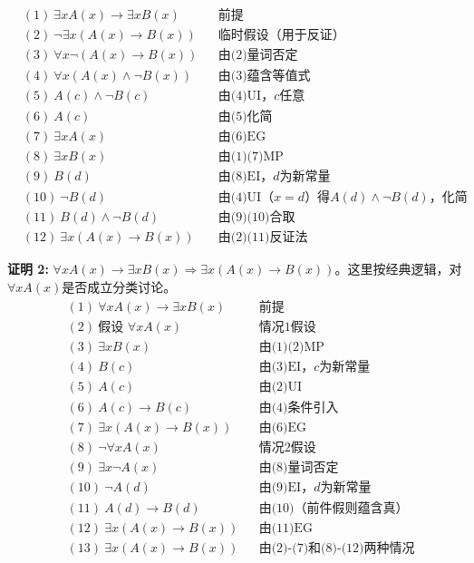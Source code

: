 \begin{align*}
&(1)\ \exists xA(x) \to \exists xB(x) && \text{前提} \\
&(2)\ \neg\exists x(A(x)\to B(x)) && \text{临时假设（用于反证）} \\
&(3)\ \forall x\neg(A(x)\to B(x)) && \text{由(2)量词否定} \\
&(4)\ \forall x(A(x) \land \neg B(x)) && \text{由(3)蕴含等值式} \\
&(5)\ A(c) \land \neg B(c) && \text{由(4)UI，$c$任意} \\
&(6)\ A(c) && \text{由(5)化简} \\
&(7)\ \exists xA(x) && \text{由(6)EG} \\
&(8)\ \exists xB(x) && \text{由(1)(7)MP} \\
&(9)\ B(d) && \text{由(8)EI，$d$为新常量} \\
&(10)\ \neg B(d) && \text{由(4)UI（$x=d$）得$A(d) \land \neg B(d)$，化简} \\
&(11)\ B(d) \land \neg B(d) && \text{由(9)(10)合取} \\
&(12)\ \exists x(A(x)\to B(x)) && \text{由(2)(11)反证法}
\end{align*}

\noindent
\textbf{证明 2:} $\forall xA(x)\to \exists xB(x)\Rightarrow \exists x(A(x)\to B(x))$。这里按经典逻辑，对$\forall xA(x)$是否成立分类讨论。
\vspace{-10pt}
\begin{align*}
&(1)\ \forall xA(x) \to \exists xB(x) && \text{前提} \\
&(2)\ \text{假设 } \forall xA(x) && \text{情况1假设} \\
&(3)\ \exists xB(x) && \text{由(1)(2)MP} \\
&(4)\ B(c) && \text{由(3)EI，$c$为新常量} \\
&(5)\ A(c) && \text{由(2)UI} \\
&(6)\ A(c) \to B(c) && \text{由(4)条件引入} \\
&(7)\ \exists x(A(x)\to B(x)) && \text{由(6)EG} \\
&(8)\ \neg\forall xA(x) && \text{情况2假设} \\
&(9)\ \exists x\neg A(x) && \text{由(8)量词否定} \\
&(10)\ \neg A(d) && \text{由(9)EI，$d$为新常量} \\
&(11)\ A(d) \to B(d) && \text{由(10)（前件假则蕴含真）} \\
&(12)\ \exists x(A(x)\to B(x)) && \text{由(11)EG} \\
&(13)\ \exists x(A(x)\to B(x)) && \text{由(2)-(7)和(8)-(12)两种情况}
\end{align*}

